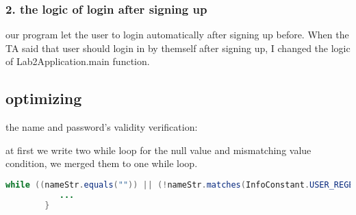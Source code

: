 \documentclass[./report.tex]{subfiles}
\begin{document}
		\subsubsection{2. the logic of login after signing up}
		\par our program let the user to login automatically after signing up before. When the TA said that user should login in by themself after signing up, I changed the logic of Lab2Application.main function.

	\subsection{optimizing}
	\par the name and password's validity verification:
	\par at first we write two while loop  for the null value and mismatching value condition, we merged them to one while loop.
\begin{lstlisting}[language=java]
 while ((nameStr.equals("")) || (!nameStr.matches(InfoConstant.USER_REGEX))) {
           ...
        }
\end{lstlisting}
	
	

	
    
   

	
		
\end{document}
